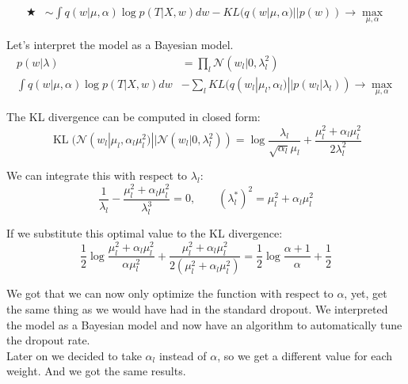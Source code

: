 \begin{align*}
    \bigstar &\sim \int q(w | \mu, \alpha) \log p(T | X, w) d w - KL(q(w | \mu, \alpha) || p(w)) \to \max_{\mu, \alpha} 
\end{align*}

Let's interpret the model as a Bayesian model. 
\begin{equation*}
    \begin{aligned}
        p(w | \lambda) &= \prod_{l} \mathcal{N} (w_l | 0, \lambda_l^{2}) \\ 
        \int q(w | \mu, \alpha) \log p(T | X, w) d w &- \sum_l KL (q(w_l | \mu_l, \alpha_l) || p(w_l | \lambda_l)) \to \max_{\mu, \alpha}
    \end{aligned}
\end{equation*}

The KL divergence can be computed in closed form:
\[ 
    \operatorname{KL}(\mathcal{N} (w_l | \mu_l, \alpha_l \mu_l^2) || \mathcal{N} (w_l | 0, \lambda_l^2)) = \log \frac{\lambda_l}{\sqrt{\alpha_l} \mu_l} + \frac{\mu_l^2 + \alpha_l \mu_l^2}{2 \lambda_l^2} 
\]

We can integrate this with respect to $\lambda_l$: 
\[
    \frac{1}{\lambda_l} - \frac{\mu_l^2 + \alpha_l \mu_l^2}{\lambda_l^3} = 0, \qquad (\lambda_l^*)^2 = \mu_l^2 + \alpha_l \mu_l^2
\]

If we substitute this optimal value to the KL divergence: 
\[
    \frac{1}{2} \log \frac{\mu_l^2 + \alpha_l \mu_l^2}{\alpha \mu_l^2} + \frac{\mu_l^2 + \alpha_l \mu_l^2}{2 (\mu_l^2 + \alpha_l \mu_l^2)} = \frac{1}{2} \log \frac{\alpha + 1}{\alpha} + \frac{1}{2}
\] 

We got that we can now only optimize the function with respect to $\alpha$, yet, get the same thing as we would have had in the standard dropout. We interpreted the model as a Bayesian model and now have an algorithm to automatically tune the dropout rate. \\ 

Later on we decided to take $\alpha_l$ instead of $\alpha$, so we get a different value for each weight. And we got the same results. 

